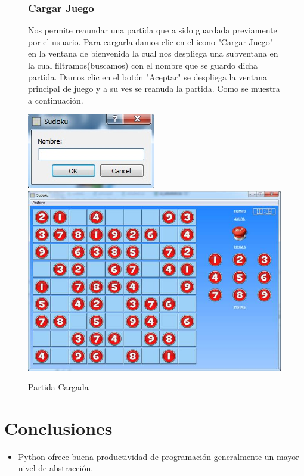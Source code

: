 \documentclass[12pt,oneside]{book}
\begin{document}
\begin{figure}
			\subsection{Cargar Juego}
Nos permite reaundar una partida que a sido guardada previamente por el usuario. Para cargarla damos clic en el icono "Cargar Juego" en la ventana de bienvenida la cual nos despliega una subventana en la cual filtramos(buscamos) con el nombre que se guardo dicha partida. Damos clic en el botón "Aceptar" se despliega la ventana principal de juego y a su ves se reanuda la partida. Como se muestra a continuación.
				\begin{center} 
					\includegraphics[width=.60\textwidth]{./imagenes/nombre.jpg}
					\includegraphics[width=.60\textwidth]{./imagenes/partidaCargada.jpg}
					\caption{Partida Cargada}
					\label{Partida Cargada}
				\end{center}


		\end{figure}
	\chapter{Conclusiones}
		\begin{itemize}
\item Python ofrece buena productividad de programación generalmente un mayor nivel de abstracción.

		\end{itemize}
\end{document}

